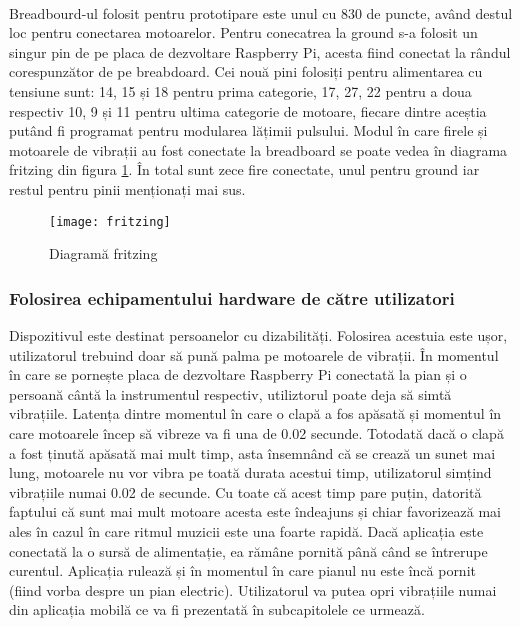 \documentclass[../IoMusT.tex]{subfiles}
\begin{document}
\\
\par Breadbourd-ul folosit pentru prototipare este unul cu 830 de puncte, având destul loc pentru conectarea motoarelor. Pentru conecatrea la ground s-a folosit un singur pin de pe placa de dezvoltare  Raspberry Pi, acesta fiind conectat la rândul corespunzător de pe breabdoard. Cei nouă pini folosiți pentru alimentarea cu tensiune sunt: 14, 15 și 18 pentru prima categorie, 17, 27, 22 pentru a doua respectiv 10, 9 și 11 pentru ultima categorie de motoare, fiecare dintre aceștia putând fi programat pentru modularea lățimii pulsului. Modul în care firele și motoarele de vibrații au fost conectate la breadboard se poate vedea în diagrama fritzing din figura \ref{fig:breadboardConnection}. În total sunt zece fire conectate, unul pentru ground iar restul pentru pinii menționați mai sus.
\begin{figure}[h]
\centering
\texttt{[image: fritzing]}
\caption{Diagramă fritzing}
\label{fig:breadboardConnection}
\end{figure}  
\newpage
\subsubsection{Folosirea echipamentului hardware de către utilizatori}
Dispozitivul este destinat persoanelor  cu dizabilități. Folosirea acestuia este ușor, utilizatorul trebuind doar să pună palma pe motoarele de vibrații. În momentul în care se pornește placa de dezvoltare Raspberry Pi conectată la pian și o persoană cântă la instrumentul respectiv, utiliztorul poate deja să simtă vibrațiile. Latența dintre momentul în care o clapă a fos apăsată și momentul în care motoarele încep să vibreze va fi una de 0.02 secunde. Totodată dacă o clapă a fost ținută apăsată mai mult timp, asta însemnând că se crează un sunet mai lung, motoarele nu vor vibra pe toată durata acestui timp, utilizatorul simțind vibrațiile numai 0.02 de secunde. Cu toate că acest timp pare puțin, datorită faptului că sunt mai mult motoare acesta este îndeajuns și chiar favorizează mai ales în cazul în care ritmul muzicii este una foarte rapidă. Dacă aplicația este conectată la o sursă de alimentație, ea rămâne pornită până când se întrerupe curentul. Aplicația rulează și în momentul în care pianul nu este încă pornit (fiind vorba despre un pian electric). Utilizatorul va putea opri vibrațiile numai din aplicația mobilă ce va fi prezentată în subcapitolele ce urmează.
\end{document}
